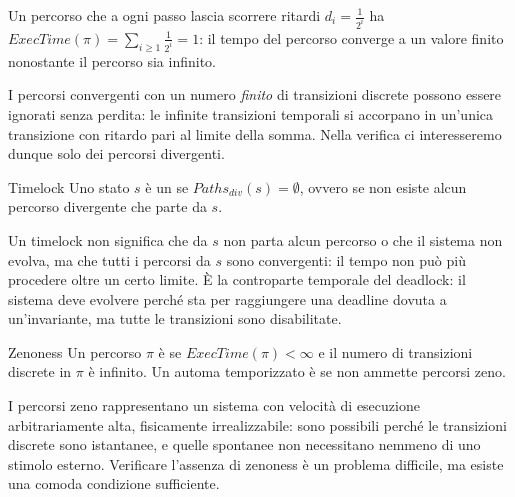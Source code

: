 \begin{example}{}
  Un percorso che a ogni passo lascia scorrere ritardi \(d_i = \frac{1}{2^i}\) ha \(ExecTime(\pi) = \sum_{i \geq 1} \frac{1}{2^i} = 1\): il tempo del percorso converge a un valore finito nonostante il percorso sia infinito.
\end{example}

I percorsi convergenti con un numero \emph{finito} di transizioni discrete possono essere ignorati senza perdita: le infinite transizioni temporali si accorpano in un'unica transizione con ritardo pari al limite della somma. Nella verifica ci interesseremo dunque solo dei percorsi divergenti.

\begin{definition}{Timelock}
  Uno stato \(s\) è un  se \(Paths_{div}(s) = \emptyset\), ovvero se non esiste alcun percorso divergente che parte da \(s\).
\end{definition}

Un timelock non significa che da \(s\) non parta alcun percorso o che il sistema non evolva, ma che tutti i percorsi da \(s\) sono convergenti: il tempo non può più procedere oltre un certo limite. È la controparte temporale del deadlock: il sistema deve evolvere perché sta per raggiungere una deadline dovuta a un'invariante, ma tutte le transizioni sono disabilitate.

\begin{definition}{Zenoness}
  Un percorso \(\pi\) è  se \(ExecTime(\pi)<\infty\) e il numero di transizioni discrete in \(\pi\) è infinito. Un automa temporizzato è  se non ammette percorsi zeno.
\end{definition}

I percorsi zeno rappresentano un sistema con velocità di esecuzione arbitrariamente alta, fisicamente irrealizzabile: sono possibili perché le transizioni discrete sono istantanee, e quelle spontanee non necessitano nemmeno di uno stimolo esterno. Verificare l'assenza di zenoness è un problema difficile, ma esiste una comoda condizione sufficiente.

